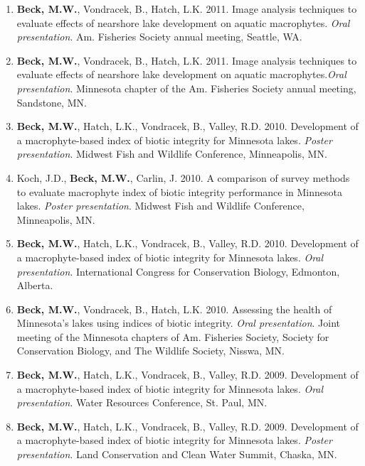 \documentclass[letterpaper,12pt]{article}
\begin{document}
\begin{enumerate}
\item {\bf Beck, M.W.}, Vondracek, B., Hatch, L.K. 2011. Image analysis techniques to evaluate effects of nearshore lake development on aquatic macrophytes. \textit{Oral presentation}. Am. Fisheries Society annual meeting, Seattle, WA.

\item {\bf Beck, M.W.}, Vondracek, B., Hatch, L.K. 2011. Image analysis techniques to evaluate effects of nearshore lake development on aquatic macrophytes.\textit{Oral presentation}. Minnesota chapter of the Am. Fisheries Society annual meeting, Sandstone, MN.

\item {\bf Beck, M.W.}, Hatch, L.K., Vondracek, B., Valley, R.D. 2010. Development of a macrophyte-based index of biotic integrity for Minnesota lakes. \textit{Poster presentation}. Midwest Fish and Wildlife Conference, Minneapolis, MN.

\item Koch, J.D., {\bf Beck, M.W.}, Carlin, J. 2010. A comparison of survey methods to evaluate macrophyte index of biotic integrity performance in Minnesota lakes. \textit{Poster presentation}. Midwest Fish and Wildlife Conference, Minneapolis, MN.

\item {\bf Beck, M.W.}, Hatch, L.K., Vondracek, B., Valley, R.D. 2010. Development of a macrophyte-based index of biotic integrity for Minnesota lakes. \textit{Oral presentation}. International Congress for Conservation Biology, Edmonton, Alberta.

\item {\bf Beck, M.W.}, Vondracek, B., Hatch, L.K. 2010. Assessing the health of Minnesota's lakes using indices of biotic integrity. \textit{Oral presentation}. Joint meeting of the Minnesota chapters of Am. Fisheries Society, Society for Conservation Biology, and The Wildlife Society, Nisswa, MN.

\item {\bf Beck, M.W.}, Hatch, L.K., Vondracek, B., Valley, R.D. 2009. Development of a macrophyte-based index of biotic integrity for Minnesota lakes. \textit{Oral presentation}. Water Resources Conference, St. Paul, MN.

\item {\bf Beck, M.W.}, Hatch, L.K., Vondracek, B., Valley, R.D. 2009. Development of a macrophyte-based index of biotic integrity for Minnesota lakes. \textit{Poster presentation}. Land Conservation and Clean Water Summit, Chaska, MN.


\end{enumerate}
\end{document}
